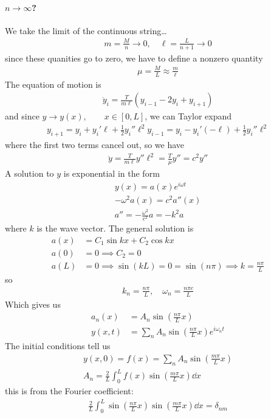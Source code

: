 \documentclass[../main.tex]{subfiles}
\begin{document}
\paragraph*{$n \to \infty$?}
We take the limit of the continuous string\dots
\begin{align*}
    m = \frac{M}{n} \to 0, \quad \ell = \frac{L}{n + 1} \to 0
\end{align*}
since these quanities go to zero, we have to define a nonzero quantity
\begin{align*}
    \mu = \frac{M}{L} \approx \frac{m}{\ell}
\end{align*}
The equation of motion is
\begin{align*}
    \ddot y_i = \frac{T}{m \ell} (y_{i - 1} - 2y_i + y_{i + 1})
\end{align*}
and since $y \to y(x), \qquad x \in [0, L]$, we can Taylor expand
\begin{align*}
    y_{i + 1} = y_i + y_i' \ell + \frac{1}{2} y_i'' \ell^2
    y_{i - 1} = y_i - y_i'(-\ell) + \frac{1}{2} y_i'' \ell^2
\end{align*}
where the first two terms cancel out, so we have
\begin{align*}
    \ddot y = \frac{T}{m \ell} y'' \ell^2 = \frac{T}{\mu} y'' = c^2 y''
\end{align*}
A solution to $y$ is exponential in the form
\begin{align*}
    y(x) = a(x) e^{i \omega t} \\
    -\omega^2 a(x) = c^2 a''(x) \\
    a'' = -\frac{\omega^2}{c^2} a = -k^2 a
\end{align*}
where $k$ is the wave vector. The general solution is
\begin{align*}
    a(x) &= C_1 \sin{kx} + C_2 \cos{kx} \\
    a(0) &= 0 \implies C_2 = 0 \\
    a(L) &= 0 \implies \sin(kL) = 0 = \sin(n\pi) \implies k = \frac{n\pi}{L}
\end{align*}
so 
\begin{align*}
    k_n = \frac{n \pi}{L}, \quad \omega_n = \frac{n \pi c}{L}
\end{align*}
Which gives us
\begin{align*}
    a_n(x) &= A_n \sin(\frac{n\pi}{L} x) \\
    y(x, t) &= \sum_n A_n \sin(\frac{n\pi}{L} x) e^{i \omega_n t}
\end{align*}
The initial conditions tell us
\begin{align*}
    y(x, 0) = f(x) = \sum_n A_n \sin(\frac{m\pi}{L} x) \\
    A_n = \frac{2}{L} \int_0^L f(x) \sin(\frac{m\pi}{L} x) \dd{x}
\end{align*}
this is from the Fourier coefficient:
\begin{align*}
    \frac{2}{L} \int_0^L \sin(\frac{n\pi}{L} x) \sin(\frac{m\pi}{L} x) \dd{x} = \delta_{nm}
\end{align*}
\end{document}
